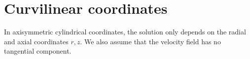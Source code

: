 \documentclass[11 pt]{report}
\begin{document}
%         
%         








\appendix
\chapter{Curvilinear coordinates}
\label{appendix:curvilinear}

In axisymmetric cylindrical coordinates, the solution only depends on the radial and axial coordinates $r, z$. We also assume that the velocity field has no tangential component.
\end{document}
